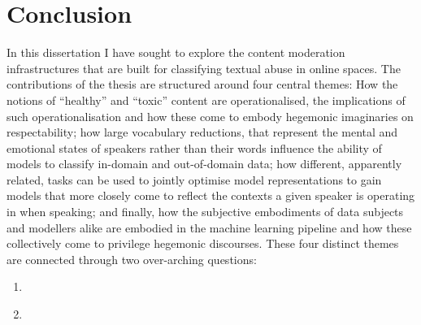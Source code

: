\ifpdf
    \graphicspath{{Chapter8/Figs/Raster/}{Chapter8/Figs/PDF/}{Chapter8/Figs/}}
\else
    \graphicspath{{Chapter8/Figs/Vector/}{Chapter8/Figs/}}
\fi

\chapter{Conclusion}\label{chap:conclusion}

In this dissertation I have sought to explore the content moderation infrastructures that are built for classifying textual abuse in online spaces.
The contributions of the thesis are structured around four central themes:
How the notions of ``healthy'' and ``toxic'' content are operationalised, the implications of such operationalisation and how these come to embody hegemonic imaginaries on respectability;
how large vocabulary reductions, that represent the mental and emotional states of speakers rather than their words influence the ability of models to classify in-domain and out-of-domain data;
how different, apparently related, tasks can be used to jointly optimise model representations to gain models that more closely come to reflect the contexts a given speaker is operating in when speaking;
and finally, how the subjective embodiments of data subjects and modellers alike are embodied in the machine learning pipeline and how these collectively come to privilege hegemonic discourses.
These four distinct themes are connected through two over-arching  questions: 
\begin{center}
\begin{minipage}{0.9\textwidth}
\vspace{5mm}
    \begin{enumerate}[start=1, label={\textbf{RQ \roman*}}]
      \item\textit{}
      \item\textit{}
    \end{enumerate}
    \vspace{5mm}
\end{minipage}
\end{center}

